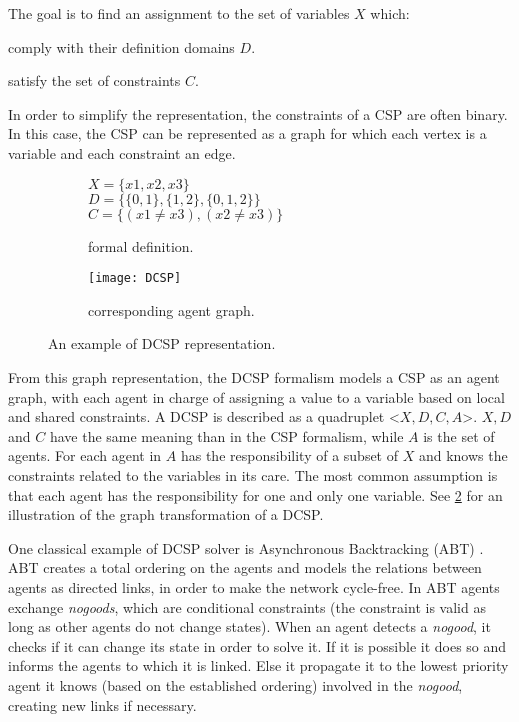 The goal is to find an assignment to the set of variables $X$ which:
\begin{compactitem}
\item comply with their definition domains $D$.
\item satisfy the set of constraints $C$.
\end{compactitem}

In order to simplify the representation, the constraints of a CSP are often binary. In this case, the CSP can be represented as a graph for which each vertex is a variable and each constraint an edge.

\begin{figure}[]
\centering
	\begin{subfigure}[b]{0.35\textwidth}
			$X = \{x1, x2, x3\}$\\
			$D = \{\{0,1\}, \{1,2\}, \{0,1,2\}\}$\\
			$C = \{(x1 \neq x3), (x2 \neq x3)\}$		
		\caption{formal definition.}
	\end{subfigure}
	\begin{subfigure}[b]{0.45\textwidth}
			\centering
			\texttt{[image: DCSP]}
			\caption{corresponding agent graph.}\label{dcsp:graph}
	\end{subfigure}

\caption{An example of DCSP representation.}
\label{dcsp}

\end{figure}

From this graph representation, the DCSP formalism\cite{yokoo1998distributed} models a CSP  as an agent graph, with each agent in charge of assigning a value to a variable based on local and shared constraints. A DCSP is described as a quadruplet <$X, D, C, A$>. $X, D$ and $C$ have the same meaning than in the CSP formalism, while $A$ is the set of agents. For each agent in $A$ has the responsibility of a subset of $X$ and knows the constraints related to the variables in its care. The most common assumption is that each agent has the responsibility for one and only one variable. See \figurename{} \ref{dcsp} for an illustration of the graph transformation of a DCSP.

One classical example of DCSP solver is Asynchronous Backtracking (ABT) \cite{Yokoo:2001:DCS:380145}. ABT creates a total ordering on the agents and models the relations between agents as directed links, in order to make the network cycle-free. In ABT agents exchange \emph{nogoods}, which are conditional constraints (the constraint is valid as long as other agents do not change states). When an agent detects a \emph{nogood}, it checks if it can change its state in order to solve it. If it is possible it does so and informs the agents to which it is linked. Else it propagate it to the lowest priority agent it knows (based on the established ordering) involved in the \emph{nogood}, creating new links if necessary.


